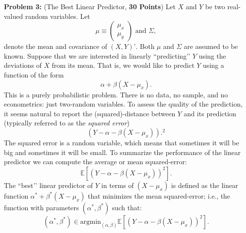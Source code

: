 \documentclass[11pt]{article} %
\begin{document}
\noindent \textbf{Problem 3:} (The Best Linear Predictor, \textbf{30 Points}) Let $X$ and $Y$ be two real-valued random variables. Let
\[\mu \equiv \begin{pmatrix} \mu_x \\ \mu_y \end{pmatrix} \textrm{ and } \Sigma, \]
denote the mean and covariance of $(X,Y)’$. Both $\mu$ and $\Sigma$ are assumed to be known. Suppose that we are interested in linearly ``predicting’’ $Y$ using the deviations of $X$ from its mean. That is, we would like to predict $Y$ using a function of the form
\[ \alpha + \beta (X-\mu_x). \]
This is a purely probabilistic problem. There is no data, no sample, and no econometrics: just two-random variables. To assess the quality of the prediction, it seems natural to report the (squared)-distance between $Y$ and its prediction (typically referred to as the \emph{squared error})
\[ (Y - \alpha -\beta (X-\mu_x)).^2 \]
The squared error is a random variable, which means that sometimes it will be big and sometimes it will be small. To summarize the performance of the linear predictor we can compute the average or mean squared-error:
\[ \mathbb{E}[(Y - \alpha -\beta (X-\mu_x))^2]. \]   
The ``best’’ linear predictor of $Y$ in terms of $(X-\mu_x)$ is defined as the linear function $\alpha^* + \beta^* (X-\mu_x)$ that minimizes the mean squared-error; i.e., the function with parameters $(\alpha^*,\beta^*)$ such that:
\[ (\alpha^*,\beta^*) \in \textrm{argmin}_{(\alpha,\beta)} \mathbb{E}[(Y-\alpha-\beta (X-\mu_x))^2].  \]
\end{document}
